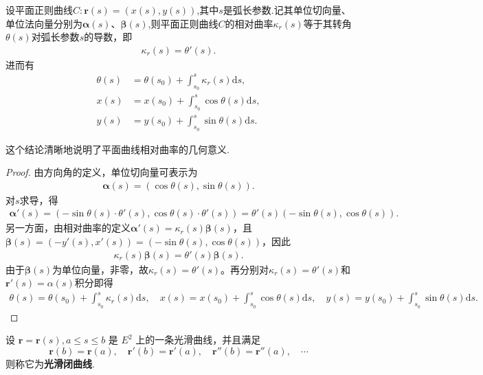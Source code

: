 \documentclass[../../main.tex]{subfiles}%
\begin{document}
\begin{theorem}\label{theorem:平面曲线转角和相对曲率参数方程的联系}
设平面正则曲线$C:\bm{r}(s)=(x(s),y(s))$,其中$s$是弧长参数.记其单位切向量、单位法向量分别为$\bm{\alpha}(s)$、$\bm{\beta}(s)$,则平面正则曲线$C$的相对曲率$\kappa_r(s)$等于其转角$\theta(s)$对弧长参数$s$的导数，即
\begin{align*}
\kappa_r(s)=\theta'(s).
\end{align*}
进而有
\begin{align*}
\theta \left( s \right) &= \theta \left( s_0 \right) +\int_{s_0}^s{\kappa _r\left( s \right) \mathrm{d}s},
\\
x\left( s \right) &= x\left( s_0 \right) +\int_{s_0}^s{\cos \theta \left( s \right) \mathrm{d}s},
\\
y\left( s \right) &= y\left( s_0 \right) +\int_{s_0}^s{\sin \theta \left( s \right) \mathrm{d}s}.
\end{align*}
\end{theorem}
\begin{remark}
这个结论清晰地说明了平面曲线相对曲率的几何意义.
\end{remark}
\begin{proof}
由方向角的定义，单位切向量可表示为
\begin{align*}
\bm{\alpha}(s)=(\cos\theta(s),\sin\theta(s)).
\end{align*}
对$s$求导，得
\begin{align*}
\bm{\alpha}'(s)=(-\sin\theta(s)\cdot\theta'(s),\cos\theta(s)\cdot\theta'(s))=\theta'(s)(-\sin\theta(s),\cos\theta(s)).
\end{align*}
另一方面，由相对曲率的定义$\bm{\alpha}'(s)=\kappa_r(s)\bm{\beta}(s)$，且$\bm{\beta}(s)=(-y'(s),x'(s))=(-\sin\theta(s),\cos\theta(s))$，因此
\begin{align*}
\kappa_r(s)\bm{\beta}(s)=\theta'(s)\bm{\beta}(s).
\end{align*}
由于$\bm{\beta}(s)$为单位向量，非零，故$\kappa_r(s)=\theta'(s)$。再分别对$\kappa_r(s)=\theta'(s)$和$\bm{r}'(s)=\alpha(s)$积分即得
\begin{align*}
\theta \left( s \right) = \theta \left( s_0 \right) +\int_{s_0}^s{\kappa _r\left( s \right) \mathrm{d}s},
\quad
x\left( s \right) = x\left( s_0 \right) +\int_{s_0}^s{\cos \theta \left( s \right) \mathrm{d}s},
\quad
y\left( s \right) = y\left( s_0 \right) +\int_{s_0}^s{\sin \theta \left( s \right) \mathrm{d}s}.
\end{align*}
\end{proof}

\begin{definition}[光滑闭曲线]
设 $\bm{r}=\bm{r}(s), a\leqslant s\leqslant b$ 是 $E^2$ 上的一条光滑曲线，并且满足
\[
\bm{r}(b)=\bm{r}(a),\quad \bm{r}'(b)=\bm{r}'(a),\quad \bm{r}''(b)=\bm{r}''(a),\quad \cdots
\]
则称它为\textbf{光滑闭曲线}.
\end{definition}
\end{document}
